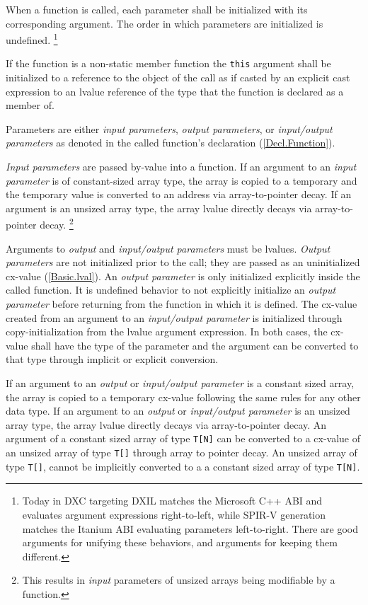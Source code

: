 \p When a function is called, each parameter shall be initialized with its
corresponding argument. The order in which parameters are initialized is
undefined. \footnote{Today in DXC targeting DXIL matches the Microsoft C++ ABI
and evaluates argument expressions right-to-left, while SPIR-V generation
matches the Itanium ABI evaluating parameters left-to-right. There are good
arguments for unifying these behaviors, and arguments for keeping them
different.}

\p If the function is a non-static member function the \texttt{this} argument
shall be initialized to a reference to the object of the call as if casted by an
explicit cast expression to an lvalue reference of the type that the function is
declared as a member of.

\p Parameters are either \textit{input parameters}, \textit{output parameters},
or \textit{input/output parameters} as denoted in the called function's
declaration (\ref{Decl.Function}).

\p \textit{Input parameters} are passed by-value into a function. If an argument
to an \textit{input parameter} is of constant-sized array type, the array is
copied to a temporary and the temporary value is converted to an address via
array-to-pointer decay. If an argument is an unsized array type, the array
lvalue directly decays via array-to-pointer decay. \footnote{This results in
\textit{input} parameters of unsized arrays being modifiable by a function.}

\p Arguments to \textit{output} and \textit{input/output parameters} must be
lvalues. \textit{Output parameters} are not initialized prior to the call; they
are passed as an uninitialized cx-value (\ref{Basic.lval}). An \textit{output
parameter} is only initialized explicitly inside the called function. It is
undefined behavior to not explicitly initialize an \textit{output parameter}
before returning from the function in which it is defined. The cx-value created
from an argument to an \textit{input/output parameter} is initialized through
copy-initialization from the lvalue argument expression. In both cases, the
cx-value shall have the type of the parameter and the argument can be converted
to that type through implicit or explicit conversion.

\p If an argument to an \textit{output} or \textit{input/output parameter} is a
constant sized array, the array is copied to a temporary cx-value following the
same rules for any other data type. If an argument to an \textit{output} or
\textit{input/output parameter} is an unsized array type, the array lvalue
directly decays via array-to-pointer decay. An argument of a constant sized
array of type \texttt{T[N]} can be converted to a cx-value of an unsized array
of type \texttt{T[]} through array to pointer decay. An unsized array of type
\texttt{T[]}, cannot be implicitly converted to a a constant sized array of type
\texttt{T[N]}.

